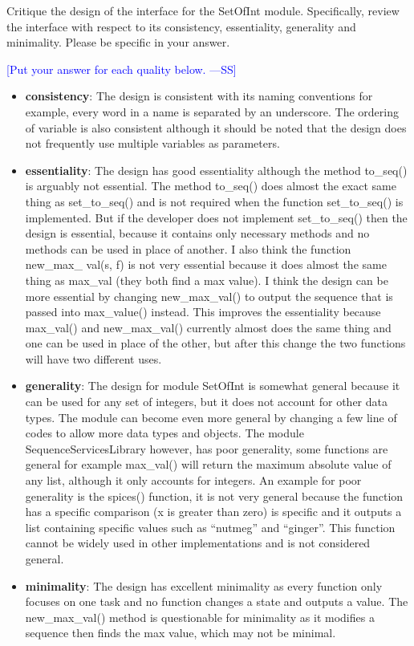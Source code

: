 \documentclass[12pt,fleqn]{examtst}
\newcommand{\authornote}[3]{\textcolor{#1}{[#3 ---#2]}}
\newcommand{\authornote}[3]{}
\newcommand{\wss}[1]{\authornote{blue}{SS}{#1}}
\begin{document}
\noindent
\begin{minipage}{\textwidth}

Critique the design of the interface for the SetOfInt module.  Specifically,
review the interface with respect to its consistency, essentiality, generality
and minimality.  Please be specific in your answer.

\wss{Put your answer for each quality below.}

\begin{itemize}
\item \textbf{consistency}:
  The design is consistent with its naming conventions for example, every word in a name is separated by an underscore. The ordering of variable is also consistent although it should be noted that the design does not frequently use multiple variables as parameters. 
\item \textbf{essentiality}:
  The design has good essentiality although the method  to\_seq() is arguably not essential. The method to\_seq() does almost the exact same thing as set\_to\_seq() and is not required when the function set\_to\_seq() is implemented. But if the developer does not implement set\_to\_seq() then the design is essential, because it contains only necessary methods and no methods can be used in place of another. I also think the function new\_max\_ val(s, f) is not very essential because it does almost the same thing as max\_val (they both find a max value). I think the design can be more essential by changing  new\_max\_val() to output the sequence that is passed into max\_value() instead. This improves the essentiality because max\_val() and new\_max\_val() currently almost does the same thing and one can be used in place of the other, but after this change the two functions will have two different uses. 
\item \textbf{generality}:
  The design for module SetOfInt is somewhat general because it can be used for any set of integers, but it does not account for other data types. The module can become even more general by changing a few line of codes to allow more data types and objects. The module SequenceServicesLibrary  however, has poor generality, some functions are general for example max\_val() will return the maximum absolute value of any list, although it only accounts for integers. An example for poor generality is the spices() function, it is not very general because the function has a specific comparison (x is greater than zero) is specific and it outputs a list containing specific values such as “nutmeg” and “ginger”. This function cannot be widely used in other implementations and is not considered general.
\item \textbf{minimality}:
  The design has excellent minimality as every function only focuses on one task and no function changes a state and outputs a value. The new\_max\_val() method is questionable for minimality as it modifies a sequence then finds the max value, which may not be minimal. 
\end{itemize}

\end{minipage}
\end{document}
